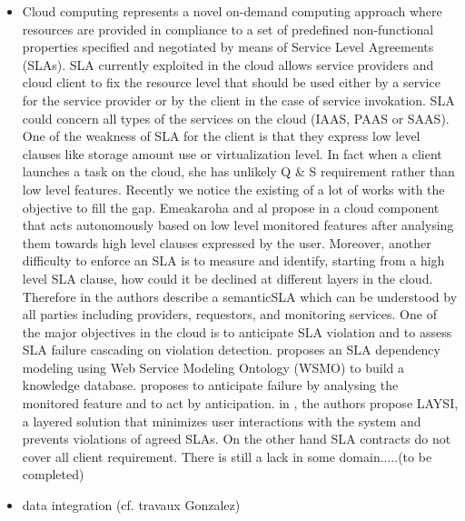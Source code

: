 
\begin{itemize}
\item Cloud computing represents a novel on-demand computing approach where resources are provided in compliance to a set of predefined non-functional properties specified and negotiated by means of Service Level Agreements (SLAs).  SLA currently exploited in the cloud allows service providers and cloud client to fix the resource level that should be used either by a service for the service provider or by the client in the case of service invokation. SLA could concern all types of the services on the cloud (IAAS, PAAS or SAAS). One of the weakness of SLA for the client is that they express low level clauses like storage amount use or virtualization level. In fact when a client launches a task on the cloud, she has unlikely Q \& S requirement rather than low level features. Recently we notice the existing of a lot of works with the objective to fill the gap.  Emeakaroha and al propose in \cite{5547150}  a cloud component that acts autonomously based on low level  monitored features after analysing them towards high level clauses expressed by the user. Moreover, another difficulty to enforce an SLA is to measure and identify, starting from a high level SLA clause, how could it be declined at different layers in the cloud. Therefore in \cite{Dastjerdi:2012:DOA:2275356.2275360} the authors describe a semanticSLA which can be understood by all parties including providers,
requestors, and monitoring services. One of the major objectives in the cloud is to anticipate SLA violation and to assess SLA failure cascading on violation detection. \cite{Dastjerdi:2012:DOA:2275356.2275360} proposes an SLA dependency modeling using Web Service Modeling Ontology (WSMO) to build a knowledge database.  \cite{5547150} proposes to anticipate failure by analysing the monitored feature and to act by anticipation. in \cite{5614035}, the authors propose LAYSI, a layered solution that minimizes user interactions with the system and prevents violations of agreed SLAs. 
On the other hand SLA contracts do not cover all client requirement. There is still a lack in some domain.....(to be completed)

 
  \item data integration (cf. travaux Gonzalez) 
\end{itemize}
